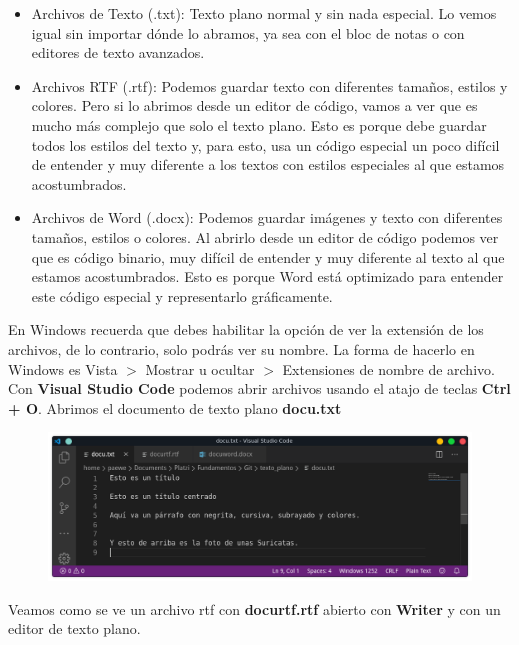 \documentclass{article}
\begin{document}
\begin{itemize}
  \item Archivos de Texto (.txt): Texto plano normal y sin nada especial. Lo
    vemos igual sin importar dónde lo abramos, ya sea con el bloc de notas o
    con editores de texto avanzados.
  \item Archivos RTF (.rtf): Podemos guardar texto con diferentes tamaños,
    estilos y colores. Pero si lo abrimos desde un editor de código, vamos a
    ver que es mucho más complejo que solo el texto plano. Esto es porque debe
    guardar todos los estilos del texto y, para esto, usa un código especial un
    poco difícil de entender y muy diferente a los textos con estilos
    especiales al que estamos acostumbrados.
  \item Archivos de Word (.docx): Podemos guardar imágenes y texto con
    diferentes tamaños, estilos o colores. Al abrirlo desde un editor de código
    podemos ver que es código binario, muy difícil de entender y muy diferente
    al texto al que estamos acostumbrados. Esto es porque Word está optimizado
    para entender este código especial y representarlo gráficamente.
\end{itemize}

En Windows recuerda que debes habilitar la opción de ver la extensión de los
archivos, de lo contrario, solo podrás ver su nombre. La forma de hacerlo en
Windows es Vista $>$ Mostrar u ocultar $>$ Extensiones de nombre de archivo.\\

Con \textbf{Visual Studio Code} podemos abrir archivos usando el atajo de
teclas \textbf{Ctrl + O}. Abrimos el documento de texto plano \textbf{docu.txt}

\begin{figure}[h!]
  \centering
  \includegraphics[scale=0.5]{./Pictures/050_texto_plano.png}
\end{figure}

Veamos como se ve un archivo rtf con \textbf{docurtf.rtf} abierto con
\textbf{Writer} y con un editor de texto plano.
\end{document}
